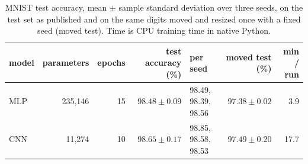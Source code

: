 \begin{table}[H]
\centering
\begin{tabular}{@{}lrrrlrr@{}}
\toprule
model & parameters & epochs & test accuracy (\%) & per seed & moved test (\%) & min / run \\
\midrule
MLP & 235,146 & 15 & $98.48 \pm 0.09$ & 98.49, 98.39, 98.56 & $97.38 \pm 0.02$ & 3.9 \\
CNN & 11,274 & 10 & $98.65 \pm 0.17$ & 98.85, 98.58, 98.53 & $97.49 \pm 0.20$ & 17.7 \\
\bottomrule
\end{tabular}
\caption{MNIST test accuracy, mean $\pm$ sample standard deviation over three seeds, on the test set as published and on the same digits moved and resized once with a fixed seed (moved test). Time is CPU training time in native Python.}
\label{tab:mnist}
\end{table}
